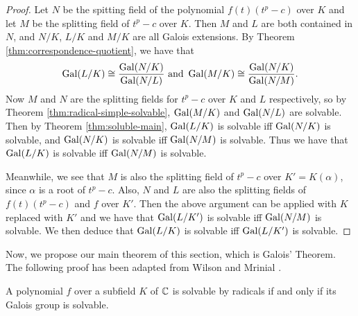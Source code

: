 \begin{proof}
	Let $N$ be the spitting field of the polynomial $f(t)(t^p - c)$ over $K$ and let $M$ be the splitting field of $t^p -c $ over $K$. Then $M$ and $L$ are both contained in $N$, and $N/K$, $L/K$ and $M/K$ are all Galois extensions. By Theorem \ref{thm:correspondence-quotient}, we have that 
	$$ \operatorname{Gal}(L / K) \cong \frac{\operatorname{Gal}(N / K)}{\operatorname{Gal}(N / L)} \text{ and } \operatorname{Gal}(M / K) \cong \frac{\operatorname{Gal}(N / K)}{\operatorname{Gal}(N / M)}.$$
	Now $M$ and $N$ are the splitting fields for $t^p - c$ over $K$ and $L$ respectively, so by Theorem \ref{thm:radical-simple-solvable}, $\operatorname{Gal}(M/K)$ and $\operatorname{Gal}(N / L)$ are solvable. Then by Theorem \ref{thm:soluble-main}, $\operatorname{Gal}(L/K)$ is solvable iff $\operatorname{Gal}(N/K)$ is solvable, and $\operatorname{Gal}(N / K)$ is solvable iff $\operatorname{Gal}(N/M)$ is solvable. Thus we have that $\operatorname{Gal}(L/K)$ is solvable iff $\operatorname{Gal}(N/M)$ is solvable. 
	
	Meanwhile, we see that $M$ is also the splitting field of $t^p - c$ over $K' = K(\alpha)$, since $\alpha$ is a root of $t^p - c$. Also, $N$ and $L$ are also the splitting fields of $f(t) (t^p - c)$ and $f$ over $K'$. Then the above argument can be applied with $K$ replaced with $K'$ and we have that $\operatorname{Gal}(L/K')$ is solvable iff $\operatorname{Gal}(N/M)$ is solvable. We then deduce that $\operatorname{Gal}(L/K)$ is solvable iff $\operatorname{Gal}(L/K')$ is solvable. 
\end{proof}

Now, we propose our main theorem of this section, which is Galois' Theorem. The following proof has been adapted from Wilson \cite{cambridge-galois-lecture-polynomials} and Mrinial \cite{Abel-Ruffini}.

\begin{theorem}\label{thm:galois-theorem}
	A polynomial $f$ over a subfield $K$ of $\mathbb C$ is solvable by radicals if and only if its Galois group is solvable.
\end{theorem}

